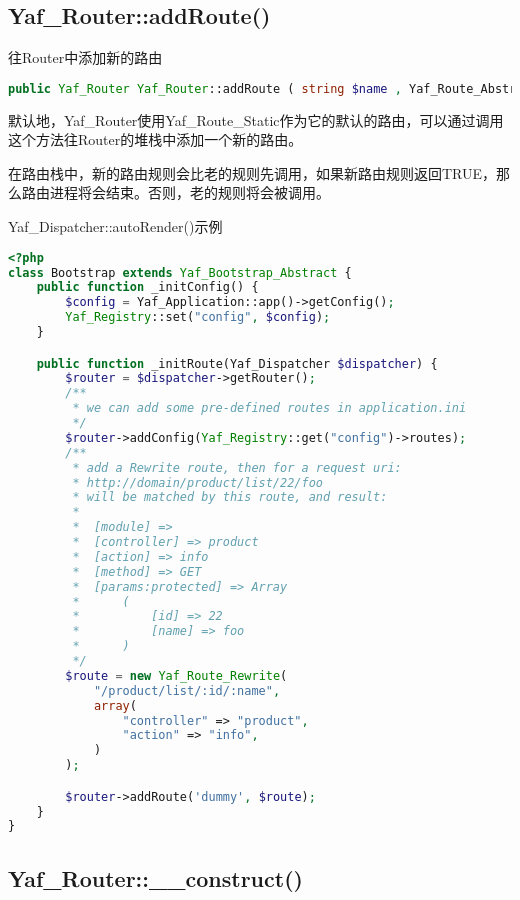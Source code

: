\subsection{Yaf\_Router::addRoute()}

往Router中添加新的路由


\begin{lstlisting}[language=PHP]
public Yaf_Router Yaf_Router::addRoute ( string $name , Yaf_Route_Abstract $route )
\end{lstlisting}


默认地，Yaf\_Router使用Yaf\_Route\_Static作为它的默认的路由，可以通过调用这个方法往Router的堆栈中添加一个新的路由。

在路由栈中，新的路由规则会比老的规则先调用，如果新路由规则返回TRUE，那么路由进程将会结束。否则，老的规则将会被调用。

\begin{example}
Yaf\_Dispatcher::autoRender()示例
\begin{lstlisting}[language=PHP]
<?php
class Bootstrap extends Yaf_Bootstrap_Abstract {
    public function _initConfig() {
        $config = Yaf_Application::app()->getConfig();
        Yaf_Registry::set("config", $config);
    }

    public function _initRoute(Yaf_Dispatcher $dispatcher) {
        $router = $dispatcher->getRouter();
        /**
         * we can add some pre-defined routes in application.ini
         */
        $router->addConfig(Yaf_Registry::get("config")->routes);
        /**
         * add a Rewrite route, then for a request uri:
         * http://domain/product/list/22/foo
         * will be matched by this route, and result:
         *
         *  [module] =>
         *  [controller] => product
         *  [action] => info
         *  [method] => GET
         *  [params:protected] => Array
         *      (
         *          [id] => 22
         *          [name] => foo
         *      )
         */
        $route = new Yaf_Route_Rewrite(
            "/product/list/:id/:name",
            array(
                "controller" => "product",
                "action" => "info",
            )
        );

        $router->addRoute('dummy', $route);
    }
}
\end{lstlisting}
\end{example}







\subsection{Yaf\_Router::\_\_construct()}



